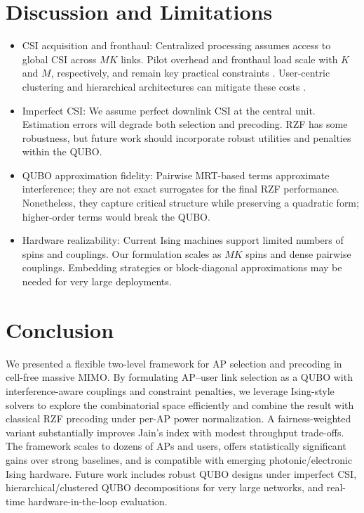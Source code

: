 \section{Discussion and Limitations}
\begin{itemize}
\item CSI acquisition and fronthaul: Centralized processing assumes access to global CSI across $MK$ links. Pilot overhead and fronthaul load scale with $K$ and $M$, respectively, and remain key practical constraints \cite{bjornson2016massive,demir2021foundations}. User-centric clustering and hierarchical architectures can mitigate these costs \cite{chen2020structured}.
\item Imperfect CSI: We assume perfect downlink CSI at the central unit. Estimation errors will degrade both selection and precoding. RZF has some robustness, but future work should incorporate robust utilities and penalties within the QUBO.
\item QUBO approximation fidelity: Pairwise MRT-based terms approximate interference; they are not exact surrogates for the final RZF performance. Nonetheless, they capture critical structure while preserving a quadratic form; higher-order terms would break the QUBO.
\item Hardware realizability: Current Ising machines support limited numbers of spins and couplings. Our formulation scales as $MK$ spins and dense pairwise couplings. Embedding strategies or block-diagonal approximations may be needed for very large deployments.
\end{itemize}

\section{Conclusion}
We presented a flexible two-level framework for AP selection and precoding in cell-free massive MIMO. By formulating AP–user link selection as a QUBO with interference-aware couplings and constraint penalties, we leverage Ising-style solvers to explore the combinatorial space efficiently and combine the result with classical RZF precoding under per-AP power normalization. A fairness-weighted variant substantially improves Jain's index with modest throughput trade-offs. The framework scales to dozens of APs and users, offers statistically significant gains over strong baselines, and is compatible with emerging photonic/electronic Ising hardware. Future work includes robust QUBO designs under imperfect CSI, hierarchical/clustered QUBO decompositions for very large networks, and real-time hardware-in-the-loop evaluation.





